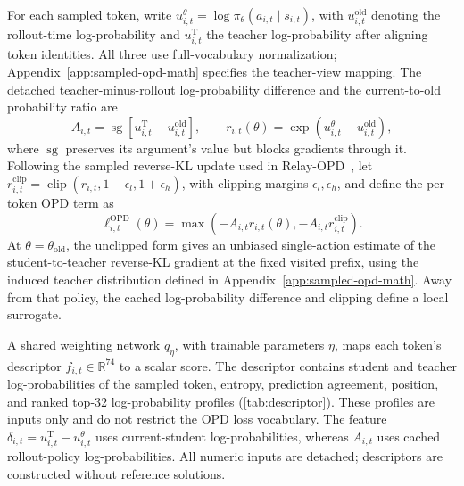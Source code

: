 \documentclass{article}
\theoremstyle{plain}
\theoremstyle{definition}
\theoremstyle{remark}
\newcommand{\R}{\mathbb{R}}
\begin{document}
For each sampled token, write \(u^\theta_{i,t}=\log\pi_\theta(a_{i,t}\mid s_{i,t})\), with \(u^{\mathrm{old}}_{i,t}\) denoting the rollout-time log-probability and \(u^{\mathrm T}_{i,t}\) the teacher log-probability after aligning token identities. All three use full-vocabulary normalization; Appendix~\ref{app:sampled-opd-math} specifies the teacher-view mapping. The detached teacher-minus-rollout log-probability difference and the current-to-old probability ratio are
\begin{equation}
    A_{i,t}=\operatorname{sg}[u^{\mathrm T}_{i,t}-u^{\mathrm{old}}_{i,t}],
    \qquad r_{i,t}(\theta)=\exp(u^\theta_{i,t}-u^{\mathrm{old}}_{i,t}),
    \label{eq:sampled-opd-state}
\end{equation}
where \(\operatorname{sg}\) preserves its argument's value but blocks gradients through it. Following the sampled reverse-KL update used in Relay-OPD~\citep{xu2026pass}, let \(r^{\mathrm{clip}}_{i,t}=\operatorname{clip}(r_{i,t},1-\epsilon_l,1+\epsilon_h)\), with clipping margins \(\epsilon_l,\epsilon_h\), and define the per-token OPD term as
\begin{equation}
    \ell^{\mathrm{OPD}}_{i,t}(\theta)
    =\max\!\left(-A_{i,t}r_{i,t}(\theta),-A_{i,t}r^{\mathrm{clip}}_{i,t}\right).
    \label{eq:sampled-opd-token-loss}
\end{equation}
At \(\theta=\theta_{\mathrm{old}}\), the unclipped form gives an unbiased single-action estimate of the student-to-teacher reverse-KL gradient at the fixed visited prefix, using the induced teacher distribution defined in Appendix~\ref{app:sampled-opd-math}. Away from that policy, the cached log-probability difference and clipping define a local surrogate.

A shared weighting network \(q_\eta\), with trainable parameters \(\eta\), maps each token's descriptor \(f_{i,t}\in\R^{74}\) to a scalar score. The descriptor contains student and teacher log-probabilities of the sampled token, entropy, prediction agreement, position, and ranked top-32 log-probability profiles (\cref{tab:descriptor}). These profiles are inputs only and do not restrict the OPD loss vocabulary. The feature \(\delta_{i,t}=u^{\mathrm T}_{i,t}-u^\theta_{i,t}\) uses current-student log-probabilities, whereas \(A_{i,t}\) uses cached rollout-policy log-probabilities. All numeric inputs are detached; descriptors are constructed without reference solutions.
\end{document}
